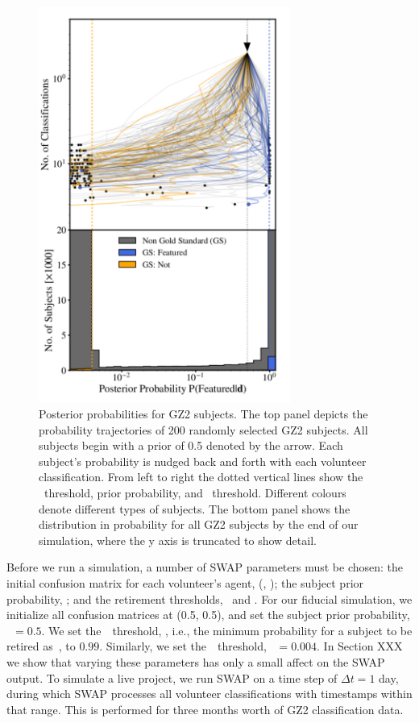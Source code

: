 \begin{figure} 
\centering
\includegraphics[width=3.25in]{Figures/human_machine/f12.pdf}
\caption[Galaxy posterior probabitilies realized through SWAP reprocessing of GZ2 data.]{Posterior probabilities for GZ2 subjects.  The top panel depicts the probability trajectories of 200 randomly selected GZ2 subjects. All subjects begin with a prior of 0.5 denoted by the arrow. Each subject's probability is nudged back and forth with each volunteer classification. From left to right the dotted vertical lines show the \notfeat~threshold, prior probability, and \feat~threshold. Different colours denote different types of subjects. The bottom panel shows the distribution in probability for all GZ2 subjects by the end of our simulation, where the y axis is truncated to show detail.}
\label{fig: subject probabilities}
\end{figure}


Before we run a simulation, a number of SWAP parameters must be chosen: the initial confusion matrix for each volunteer's agent, (\Pf, \Pn); the subject prior probability, \p; and the retirement thresholds, \tf~and \tn. For our fiducial  simulation, we initialize all confusion matrices at (0.5, 0.5), and set the subject prior probability, \p~$= 0.5$. We set the~\feat~threshold, \tf, i.e., the minimum probability for a subject to be retired as~\feat, to $0.99$. Similarly, we set the~\notfeat~threshold, \tn~$= 0.004$. In Section XXX we show that varying these parameters has only a small affect on the SWAP output. To simulate a live project, we run SWAP on a time step of $\Delta t = 1$ day, during which SWAP processes all volunteer classifications with timestamps within that range. This is performed for three months worth of GZ2 classification data. 


